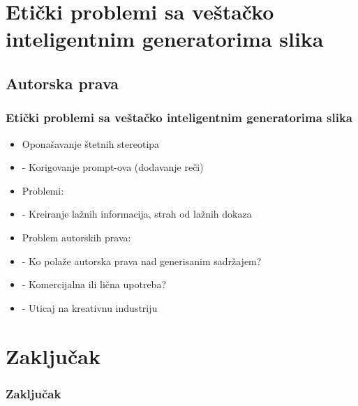 \documentclass{beamer}
\begin{document}
\section{Etički problemi sa veštačko inteligentnim generatorima slika} %
\subsection{Autorska prava}

\begin{frame}[fragile]\frametitle{Etički problemi sa veštačko inteligentnim generatorima slika}
	
	\begin{itemize}
		\item Oponašavanje štetnih stereotipa
        \item[]  - Korigovanje prompt-ova (dodavanje reči)
        \item Problemi:
        \item[] - Kreiranje lažnih informacija, strah od lažnih dokaza
        \item Problem autorskih prava:
		\item[] - Ko polaže autorska prava nad generisanim sadržajem?
		\item[] - Komercijalna ili lična upotreba?
		\item[] - Uticaj na kreativnu industriju
	\end{itemize}	
	
\end{frame}

\section{Zaključak} %

\begin{frame}[fragile]\frametitle{Zaključak}
	
\end{frame}
\end{document}
